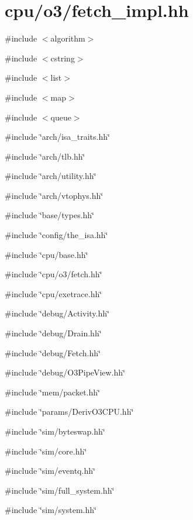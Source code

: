 \hypertarget{fetch__impl_8hh}{
\section{cpu/o3/fetch\_\-impl.hh}
\label{fetch__impl_8hh}
}
{\ttfamily \#include $<$algorithm$>$}\par
{\ttfamily \#include $<$cstring$>$}\par
{\ttfamily \#include $<$list$>$}\par
{\ttfamily \#include $<$map$>$}\par
{\ttfamily \#include $<$queue$>$}\par
{\ttfamily \#include \char`\"{}arch/isa\_\-traits.hh\char`\"{}}\par
{\ttfamily \#include \char`\"{}arch/tlb.hh\char`\"{}}\par
{\ttfamily \#include \char`\"{}arch/utility.hh\char`\"{}}\par
{\ttfamily \#include \char`\"{}arch/vtophys.hh\char`\"{}}\par
{\ttfamily \#include \char`\"{}base/types.hh\char`\"{}}\par
{\ttfamily \#include \char`\"{}config/the\_\-isa.hh\char`\"{}}\par
{\ttfamily \#include \char`\"{}cpu/base.hh\char`\"{}}\par
{\ttfamily \#include \char`\"{}cpu/o3/fetch.hh\char`\"{}}\par
{\ttfamily \#include \char`\"{}cpu/exetrace.hh\char`\"{}}\par
{\ttfamily \#include \char`\"{}debug/Activity.hh\char`\"{}}\par
{\ttfamily \#include \char`\"{}debug/Drain.hh\char`\"{}}\par
{\ttfamily \#include \char`\"{}debug/Fetch.hh\char`\"{}}\par
{\ttfamily \#include \char`\"{}debug/O3PipeView.hh\char`\"{}}\par
{\ttfamily \#include \char`\"{}mem/packet.hh\char`\"{}}\par
{\ttfamily \#include \char`\"{}params/DerivO3CPU.hh\char`\"{}}\par
{\ttfamily \#include \char`\"{}sim/byteswap.hh\char`\"{}}\par
{\ttfamily \#include \char`\"{}sim/core.hh\char`\"{}}\par
{\ttfamily \#include \char`\"{}sim/eventq.hh\char`\"{}}\par
{\ttfamily \#include \char`\"{}sim/full\_\-system.hh\char`\"{}}\par
{\ttfamily \#include \char`\"{}sim/system.hh\char`\"{}}\par
